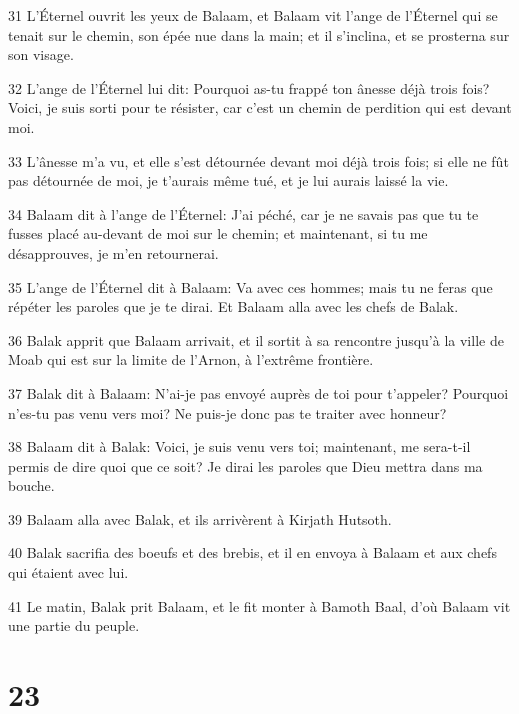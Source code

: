 \par 31 L'Éternel ouvrit les yeux de Balaam, et Balaam vit l'ange de l'Éternel qui se tenait sur le chemin, son épée nue dans la main; et il s'inclina, et se prosterna sur son visage.
\par 32 L'ange de l'Éternel lui dit: Pourquoi as-tu frappé ton ânesse déjà trois fois? Voici, je suis sorti pour te résister, car c'est un chemin de perdition qui est devant moi.
\par 33 L'ânesse m'a vu, et elle s'est détournée devant moi déjà trois fois; si elle ne fût pas détournée de moi, je t'aurais même tué, et je lui aurais laissé la vie.
\par 34 Balaam dit à l'ange de l'Éternel: J'ai péché, car je ne savais pas que tu te fusses placé au-devant de moi sur le chemin; et maintenant, si tu me désapprouves, je m'en retournerai.
\par 35 L'ange de l'Éternel dit à Balaam: Va avec ces hommes; mais tu ne feras que répéter les paroles que je te dirai. Et Balaam alla avec les chefs de Balak.
\par 36 Balak apprit que Balaam arrivait, et il sortit à sa rencontre jusqu'à la ville de Moab qui est sur la limite de l'Arnon, à l'extrême frontière.
\par 37 Balak dit à Balaam: N'ai-je pas envoyé auprès de toi pour t'appeler? Pourquoi n'es-tu pas venu vers moi? Ne puis-je donc pas te traiter avec honneur?
\par 38 Balaam dit à Balak: Voici, je suis venu vers toi; maintenant, me sera-t-il permis de dire quoi que ce soit? Je dirai les paroles que Dieu mettra dans ma bouche.
\par 39 Balaam alla avec Balak, et ils arrivèrent à Kirjath Hutsoth.
\par 40 Balak sacrifia des boeufs et des brebis, et il en envoya à Balaam et aux chefs qui étaient avec lui.
\par 41 Le matin, Balak prit Balaam, et le fit monter à Bamoth Baal, d'où Balaam vit une partie du peuple.

\chapter{23}

